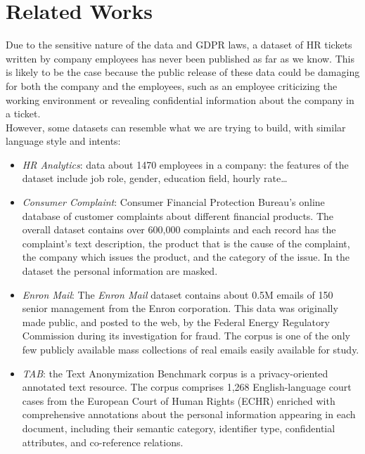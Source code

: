 \chapter{Related Works}
\label{sec:RelatedWorks}
Due to the sensitive nature of the data and GDPR laws, a dataset of HR tickets written by company employees has never been published as far as we know. This is likely to be the case because the public release of these data could be damaging for both the company and the employees, such as an employee criticizing the working environment or revealing confidential information about the company in a ticket.\\
However, some datasets can resemble what we are trying to build, with similar language style and intents:
\begin{itemize}
    \item \textit{HR Analytics}: data about 1470 employees in a company: the features of the dataset include job role, gender, education field, hourly rate\dots 
    \item \textit{Consumer Complaint}: Consumer Financial Protection Bureau's online database of customer complaints about different financial products. The overall dataset contains over 600,000 complaints and each record has the complaint's text description, the product that is the cause of the complaint, the company which issues the product, and the category of the issue. In the dataset the personal information are masked.
    \item \textit{Enron Mail}: The \textit{Enron Mail} dataset contains about 0.5M emails of 150 senior management from the Enron corporation. This data was originally made public, and posted to the web, by the Federal Energy Regulatory Commission during its investigation for fraud. The corpus is one of the only few publicly available mass collections of real emails easily available for study.
    \item \textit{TAB}: the Text Anonymization Benchmark corpus\cite{pilan2022text} is a privacy-oriented annotated text resource. The corpus comprises 1,268 English-language court cases from the European Court of Human Rights (ECHR) enriched with comprehensive annotations about the personal information appearing in each document, including their semantic category, identifier type, confidential attributes, and co-reference relations.
\end{itemize}
